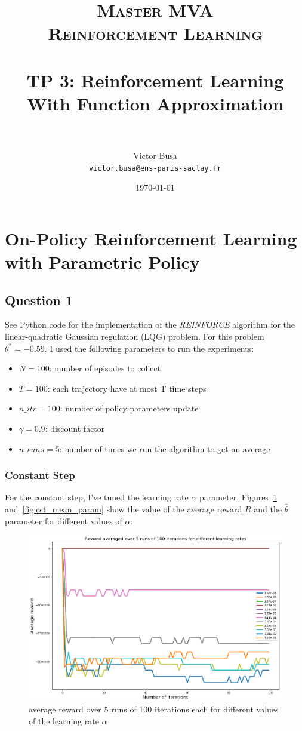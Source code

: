 \documentclass[11pt]{article}
\title{	
\normalfont \normalsize 
\textsc{Master MVA \\
Reinforcement Learning} \\ [20pt]
\horrule{0.5pt} \\[0.2cm] %
\textbf{TP 3}: Reinforcement Learning With Function Approximation \\
\horrule{2pt} \\[0.3cm] %
}
\author{Victor Busa \\
   \texttt{victor.busa@ens-paris-saclay.fr}}
\date{\normalsize\today}
\numberwithin{figure}{section} %
\begin{document}
\maketitle

\section{On-Policy Reinforcement Learning with Parametric Policy}
\subsection{Question 1}
See Python code for the implementation of the \emph{REINFORCE} algorithm for the linear-quadratic Gaussian regulation (LQG) problem. For this problem $\theta^* = -0.59$. I used the following parameters to run the experiments:

\begin{itemize}
\item $N = 100$: number of episodes to collect
\item $T = 100$: each trajectory have at most T time steps
\item $n\_itr = 100$: number of policy parameters update
\item $\gamma = 0.9$: discount factor
\item $n\_runs = 5$: number of times we run the algorithm to get an average
\end{itemize}

\subsubsection{Constant Step}
For the constant step, I've tuned the learning rate $\alpha$ parameter. Figures~\ref{fig:cst_avg_reward} and~\ref{fig:cst_mean_param} show the value of the average reward $R$ and the $\widehat{\theta}$ parameter for different values of $\alpha$:

\begin{figure}[H]
		\centering
		\includegraphics[width=0.9\linewidth]{images/avg_reward}
		\caption{average reward over 5 runs of 100 iterations each for different values of the learning rate $\alpha$}
		\label{fig:cst_avg_reward}
\end{figure}
\end{document}
